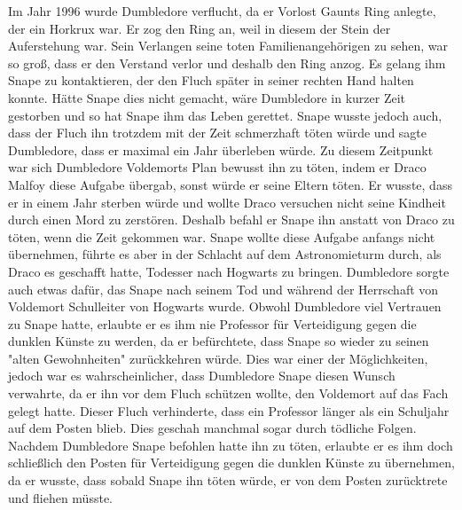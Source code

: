 \documentclass[a4paper, 10pt]{article}
\begin{document}
Im Jahr 1996 wurde Dumbledore verflucht, da er Vorlost Gaunts Ring anlegte, der ein Horkrux war. Er zog den Ring an, weil in diesem der Stein der Auferstehung war. Sein Verlangen seine toten Familienangehörigen zu sehen, war so groß, dass er den Verstand verlor und deshalb den Ring anzog. Es gelang ihm Snape zu kontaktieren, der den Fluch später in seiner rechten Hand halten konnte. Hätte Snape dies nicht gemacht, wäre Dumbledore in kurzer Zeit gestorben und so hat Snape ihm das Leben gerettet. Snape wusste jedoch auch, dass der Fluch ihn trotzdem mit der Zeit schmerzhaft töten würde und sagte Dumbledore, dass er maximal ein Jahr überleben würde. Zu diesem Zeitpunkt war sich Dumbledore Voldemorts Plan bewusst ihn zu töten, indem er Draco Malfoy diese Aufgabe übergab, sonst würde er seine Eltern töten. Er wusste, dass er in einem Jahr sterben würde und wollte Draco versuchen nicht seine Kindheit durch einen Mord zu zerstören. Deshalb befahl er Snape ihn anstatt von Draco zu töten, wenn die Zeit gekommen war. Snape wollte diese Aufgabe anfangs nicht übernehmen, führte es aber in der Schlacht auf dem Astronomieturm durch, als Draco es geschafft hatte, Todesser nach Hogwarts zu bringen. Dumbledore sorgte auch etwas dafür, das Snape nach seinem Tod und während der Herrschaft von Voldemort Schulleiter von Hogwarts wurde.
\vspace{10pt}
\newline
Obwohl Dumbledore viel Vertrauen zu Snape hatte, erlaubte er es ihm nie Professor für Verteidigung gegen die dunklen Künste zu werden, da er befürchtete, dass Snape so wieder zu seinen "alten Gewohnheiten" zurückkehren würde. Dies war einer der Möglichkeiten, jedoch war es wahrscheinlicher, dass Dumbledore Snape diesen Wunsch verwahrte, da er ihn vor dem Fluch schützen wollte, den Voldemort auf das Fach gelegt hatte. Dieser Fluch verhinderte, dass ein Professor länger als ein Schuljahr auf dem Posten blieb. Dies geschah manchmal sogar durch tödliche Folgen. Nachdem Dumbledore Snape befohlen hatte ihn zu töten, erlaubte er es ihm doch schließlich den Posten für Verteidigung gegen die dunklen Künste zu übernehmen, da er wusste, dass sobald Snape ihn töten würde, er von dem Posten zurücktrete und fliehen müsste.
\end{document}
